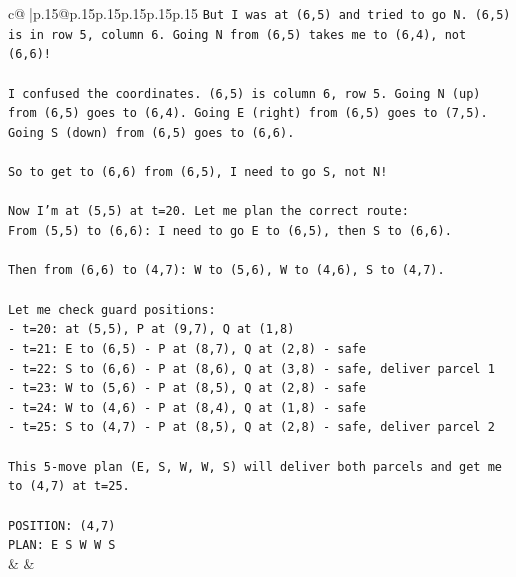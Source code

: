 \documentclass{article}
\begin{document}
{\begin{supertabular}{c@{$\;$}|p{.15\linewidth}@{}p{.15\linewidth}p{.15\linewidth}p{.15\linewidth}p{.15\linewidth}p{.15\linewidth}}
{{{\texttt{But I was at (6,5) and tried to go N. (6,5) is in row 5, column 6. Going N from (6,5) takes me to (6,4), not (6,6)!} \\
\\ 
\texttt{I confused the coordinates. (6,5) is column 6, row 5. Going N (up) from (6,5) goes to (6,4). Going E (right) from (6,5) goes to (7,5). Going S (down) from (6,5) goes to (6,6).} \\
\\ 
\texttt{So to get to (6,6) from (6,5), I need to go S, not N!} \\
\\ 
\texttt{Now I'm at (5,5) at t=20. Let me plan the correct route:} \\
\texttt{From (5,5) to (6,6): I need to go E to (6,5), then S to (6,6).} \\
\\ 
\texttt{Then from (6,6) to (4,7): W to (5,6), W to (4,6), S to (4,7).} \\
\\ 
\texttt{Let me check guard positions:} \\
\texttt{{-} t=20: at (5,5), P at (9,7), Q at (1,8)} \\
\texttt{{-} t=21: E to (6,5) {-} P at (8,7), Q at (2,8) {-} safe} \\
\texttt{{-} t=22: S to (6,6) {-} P at (8,6), Q at (3,8) {-} safe, deliver parcel 1} \\
\texttt{{-} t=23: W to (5,6) {-} P at (8,5), Q at (2,8) {-} safe} \\
\texttt{{-} t=24: W to (4,6) {-} P at (8,4), Q at (1,8) {-} safe} \\
\texttt{{-} t=25: S to (4,7) {-} P at (8,5), Q at (2,8) {-} safe, deliver parcel 2} \\
\\ 
\texttt{This 5{-}move plan (E, S, W, W, S) will deliver both parcels and get me to (4,7) at t=25.} \\
\\ 
\texttt{POSITION: (4,7)} \\
\texttt{PLAN: E S W W S} \\
            }
        }
    }
    & & \\ \\


\end{supertabular}}
\end{document}
